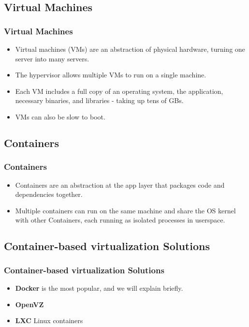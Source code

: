 \subsection{Virtual Machines}
\begin{frame}
	\frametitle{Virtual Machines}
	\begin{itemize}
		\item Virtual machines (VMs) are an abstraction of physical hardware, turning one server into many servers.
		\item The hypervisor allows multiple VMs to run on a single machine.
		\item Each VM includes a full copy of an operating system, the application, necessary binaries, and libraries - taking up tens of GBs.
		\item VMs can also be slow to boot.
	\end{itemize}
\end{frame}

\subsection{Containers}
\begin{frame}
	\frametitle{Containers}
	\begin{itemize}
		\item Containers are an abstraction at the app layer that packages code and dependencies together.
		\item Multiple containers can run on the same machine and share the OS kernel with other Containers, each running as isolated processes in userspace.
	\end{itemize}
\end{frame}

\subsection{Container-based virtualization Solutions}
\begin{frame}
	\frametitle{Container-based virtualization Solutions}
	\begin{itemize}
		\item \textbf{Docker} is the most popular, and we will explain briefly.
		\item \textbf{OpenVZ}
		\item \textbf{LXC} Linux containers 
	\end{itemize}
\end{frame}

